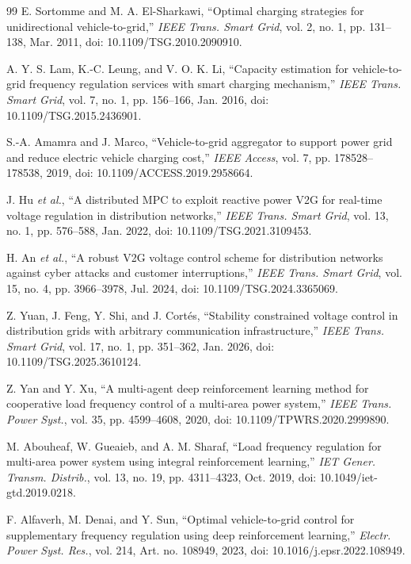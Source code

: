 \begin{thebibliography}{99}
E. Sortomme and M. A. El-Sharkawi,
``Optimal charging strategies for unidirectional vehicle-to-grid,''
\emph{IEEE Trans. Smart Grid}, vol. 2, no. 1, pp. 131--138,
Mar. 2011,
doi: 10.1109/TSG.2010.2090910.

A. Y. S. Lam, K.-C. Leung, and V. O. K. Li,
``Capacity estimation for vehicle-to-grid frequency regulation services
with smart charging mechanism,''
\emph{IEEE Trans. Smart Grid}, vol. 7, no. 1, pp. 156--166,
Jan. 2016,
doi: 10.1109/TSG.2015.2436901.

S.-A. Amamra and J. Marco,
``Vehicle-to-grid aggregator to support power grid and reduce electric
vehicle charging cost,''
\emph{IEEE Access}, vol. 7, pp. 178528--178538, 2019,
doi: 10.1109/ACCESS.2019.2958664.

J. Hu \emph{et al.},
``A distributed MPC to exploit reactive power V2G for real-time voltage
regulation in distribution networks,''
\emph{IEEE Trans. Smart Grid}, vol. 13, no. 1, pp. 576--588,
Jan. 2022,
doi: 10.1109/TSG.2021.3109453.

H. An \emph{et al.},
``A robust V2G voltage control scheme for distribution networks against
cyber attacks and customer interruptions,''
\emph{IEEE Trans. Smart Grid}, vol. 15, no. 4, pp. 3966--3978,
Jul. 2024,
doi: 10.1109/TSG.2024.3365069.

Z. Yuan, J. Feng, Y. Shi, and J. Cort{\'e}s,
``Stability constrained voltage control in distribution grids with
arbitrary communication infrastructure,''
\emph{IEEE Trans. Smart Grid}, vol. 17, no. 1, pp. 351--362,
Jan. 2026,
doi: 10.1109/TSG.2025.3610124.

Z. Yan and Y. Xu,
``A multi-agent deep reinforcement learning method for cooperative
load frequency control of a multi-area power system,''
\emph{IEEE Trans. Power Syst.}, vol. 35, pp. 4599--4608, 2020,
doi: 10.1109/TPWRS.2020.2999890.

M. Abouheaf, W. Gueaieb, and A. M. Sharaf,
``Load frequency regulation for multi-area power system using integral
reinforcement learning,''
\emph{IET Gener. Transm. Distrib.},
vol. 13, no. 19, pp. 4311--4323, Oct. 2019,
doi: 10.1049/iet-gtd.2019.0218.

F. Alfaverh, M. Denai, and Y. Sun,
``Optimal vehicle-to-grid control for supplementary frequency regulation
using deep reinforcement learning,''
\emph{Electr. Power Syst. Res.},
vol. 214, Art. no. 108949, 2023,
doi: 10.1016/j.epsr.2022.108949.


\end{thebibliography}
